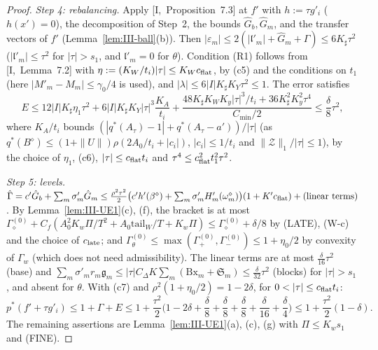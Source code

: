 \documentclass[10pt]{amsart}
\theoremstyle{definition}
\theoremstyle{remark}
\newcommand{\lin}{\mathfrak l}
\begin{document}
\begin{proof}
\emph{Step 4: rebalancing.}  Apply [I,~Proposition~7.3] at $f'$ with $h:=\tau
g'_i$ ($h(x')=0$), the decomposition of Step~2, the bounds $\hat G_b,\hat G_m$,
and the transfer vectors of $f'$ (Lemma~\ref{lem:III-ball}(b)).  Then
$|\varepsilon_m|\le2(|\lin'_m|+\hat G_m+\hat\Gamma)\le6K_\sharp\tau^2$
($|\lin'_m|\le\tau^2$ for $|\tau|>s_1$, and $\lin'_m=0$ for $\theta$).  Condition
\textup{(R1)} follows from [I,~Lemma~7.2] with $\eta:=(K_W/t_i)|\tau|\le
K_Wc_{\rm flat}$, by (c5) and the conditions on $t_1$ (here $|M'_m-M_m|\le
\gamma_0/4$ is used), and $|\lambda|\le6|I|K_\sharp K_Y\tau^2\le1$.  The error
satisfies
\[
 E\le12|I|K_\sharp\eta_1\tau^2+6|I|K_\sharp K_Y|\tau|^3\frac{K_A}{t_i}+
 \frac{48K_\sharp K_WK_y|\tau|^3/t_i+36K_\sharp^2K_y^2\tau^4}{C_{\min}/2}
 \le\frac\delta8\tau^2,
\]
where $K_A/t_i$ bounds $(|q^*(A_\tau)-1|+q^*(A_\tau-a'))/|\tau|$ (as
$q^*(B^\diamond)\le(1+\|U\|)\rho(2A_0/t_i+|c_i|)$, $|c_i|\le1/t_i$ and
$\|\mathcal Z\|_1/|\tau|\le1$), by the choice of $\eta_1$, (c6), $|\tau|\le
c_{\rm flat}t_i$ and $\tau^4\le c_{\rm flat}^2t_1^2\tau^2$.

\emph{Step 5: levels.}  $\hat\Gamma=c'\hat G_b+\sum_m\sigma'_m\hat G_m\le
\frac{\rho^2\tau^2}2\big(c'h'(\beta^\diamond)+\sum_m\sigma'_mH'_m(\omega^\diamond_m)
\big)(1+K'c_{\rm flat})+(\text{linear terms})$.  By Lemma~\ref{lem:III-UE1}(c),
(f), the bracket is at most $\Gamma^{(0)}_\diamond+C_f(A_0^2K_w\Pi/T^2+A_0
\mathrm{tail}_W/T+K_w\Pi)\le\Gamma^{(0)}_\diamond+\delta/8$ by (LATE), (W-c) and
the choice of $c_{\rm late}$; and $\Gamma^{(0)}_\theta\le\max(\Gamma^{(0)}_+,
\Gamma^{(0)}_-)\le1+\eta_0/2$ by convexity of $\Gamma_w$ (which does not need
admissibility).  The linear terms are at most $\frac\delta{16}\tau^2$ (base) and
$\sum_m\sigma'_mr_m\mathfrak g_m\le|\tau|C_\Delta K\sum_m(\mathrm{Bx}_m+
\mathfrak S_m)\le\frac\delta{32}\tau^2$ (blocks) for $|\tau|>s_1$, and absent for
$\theta$.  With (c7) and $\rho^2(1+\eta_0/2)=1-2\delta$, for $0<|\tau|\le
c_{\rm flat}t_i$:
\[
 p^*(f'+\tau g'_i)\le1+\hat\Gamma+E\le1+\frac{\tau^2}2\Big(1-2\delta+\frac\delta8
 +\frac\delta8+\frac\delta8+\frac\delta{16}+\frac\delta4\Big)\le1+\frac{\tau^2}2
 (1-\delta).
\]
The remaining assertions are Lemma~\ref{lem:III-UE1}(a), (c), (g) with
$\Pi\le K_ws_1$ and (FINE).
\end{proof}
\end{document}
